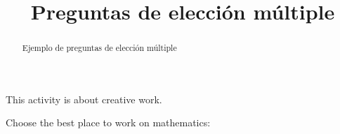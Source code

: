 \documentclass{ximera}
\title{Preguntas de elección múltiple}
\begin{document}
  
\begin{abstract}  
	Ejemplo de preguntas de elección múltiple
\end{abstract}  
\maketitle  

This activity is about creative work.  
\begin{exercise}  
  Choose the best place to work on mathematics:
  \begin{multipleChoice}  
  \end{multipleChoice}  
\end{exercise}  
\end{document}
